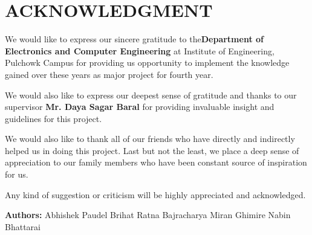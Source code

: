 
\newpage
\section*{ACKNOWLEDGMENT}
We would like to express our sincere gratitude to the ​{\bf Department of Electronics and Computer Engineering} at Institute of Engineering, Pulchowk Campus for providing us opportunity to implement the knowledge gained over these years as major project for fourth year.

We would also like to express our deepest sense of gratitude and thanks to our supervisor {\bf Mr. Daya Sagar Baral} for providing invaluable insight and guidelines for this project.

We would also like to thank all of our friends who have directly and indirectly helped us in doing this project. Last but not the least, we place a deep sense of appreciation to our family members who have been constant source of inspiration for us.

Any kind of suggestion or criticism will be highly appreciated and acknowledged.

\vskip 10mm
{\bf Authors:}
\newline Abhishek Paudel
\newline Brihat Ratna Bajracharya
\newline Miran Ghimire
\newline Nabin Bhattarai